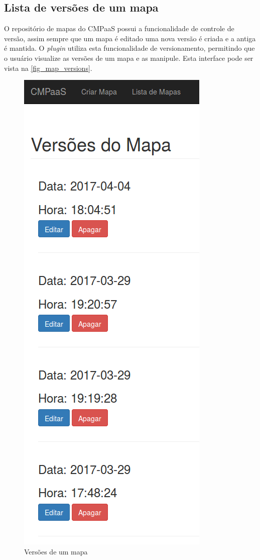 \documentclass[
	12pt,				%
	openright,			%
	oneside,			%
	a4paper,			%
	english,			%
	french,				%
	spanish,			%
	brazil				%
	]{abntex2}
\begin{document}
\subsection{Lista de versões de um mapa}      

O repositório de mapas do CMPaaS possui a funcionalidade de controle de versão, assim sempre que um mapa é editado uma nova versão é criada e a antiga é mantida. O \textit{plugin} utiliza esta funcionalidade de versionamento, permitindo que o usuário visualize as versões de um mapa e as manipule. Esta interface pode ser vista na \autoref{fig_map_versions}.

\begin{figure}[htb]
	\caption{\label{fig_map_versions} Versões de um mapa}
	\begin{center}
		\includegraphics[scale=0.4]{map_versions.png}
	\end{center}
\end{figure}
\end{document}
